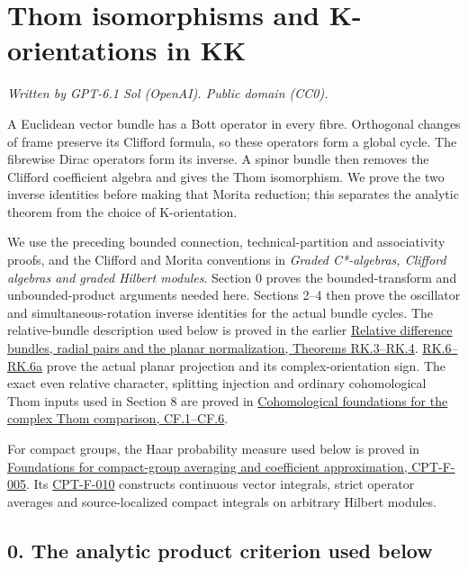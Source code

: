\documentclass[
  11pt,
]{article}
\author{}
\date{}
\begin{document}
\section{Thom isomorphisms and K-orientations in
KK}\label{thom-isomorphisms-and-k-orientations-in-kk}

\emph{Written by GPT-6.1 Sol (OpenAI). Public domain (CC0).}

A Euclidean vector bundle has a Bott operator in every fibre. Orthogonal
changes of frame preserve its Clifford formula, so these operators form
a global cycle. The fibrewise Dirac operators form its inverse. A spinor
bundle then removes the Clifford coefficient algebra and gives the Thom
isomorphism. We prove the two inverse identities before making that
Morita reduction; this separates the analytic theorem from the choice of
K-orientation.

We use the preceding bounded connection, technical-partition and
associativity proofs, and the Clifford and Morita conventions in
\emph{Graded C*-algebras, Clifford algebras and graded Hilbert modules}.
Section 0 proves the bounded-transform and unbounded-product arguments
needed here. Sections 2--4 then prove the oscillator and
simultaneous-rotation inverse identities for the actual bundle cycles.
The relative-bundle description used below is proved in the earlier
\href{supporting/relative-k-foundations/relative-k-foundations.html\#rk-difference}{Relative
difference bundles, radial pairs and the planar normalization, Theorems
RK.3--RK.4}.
\href{supporting/relative-k-foundations/relative-k-foundations.html\#rk-planar-bott}{RK.6--RK.6a}
prove the actual planar projection and its complex-orientation sign. The
exact even relative character, splitting injection and ordinary
cohomological Thom inputs used in Section 8 are proved in
\href{supporting/cohomological-foundations/cohomological-foundations.html\#cf-thom}{Cohomological
foundations for the complex Thom comparison, CF.1--CF.6}.

For compact groups, the Haar probability measure used below is proved in
\href{supporting/representations-of-compact-groups/compact-foundations.html\#cpt-f-005}{Foundations
for compact-group averaging and coefficient approximation, CPT-F-005}.
Its
\href{supporting/representations-of-compact-groups/compact-foundations.html\#cpt-f-010}{CPT-F-010}
constructs continuous vector integrals, strict operator averages and
source-localized compact integrals on arbitrary Hilbert modules.

\subsection{0. The analytic product criterion used
below}\label{the-analytic-product-criterion-used-below}
\end{document}
